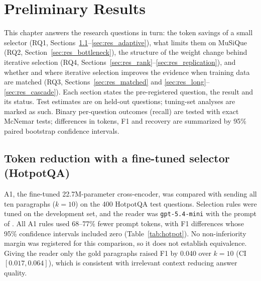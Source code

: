\chapter{Preliminary Results}
\label{chap:results}

This chapter answers the research questions in turn: the token savings of a small selector (RQ1, Sections~\ref{sec:res_selector}--\ref{sec:res_adaptive}), what limits them on MuSiQue (RQ2, Section~\ref{sec:res_bottleneck}), the structure of the weight change behind iterative selection (RQ4, Sections~\ref{sec:res_rank}--\ref{sec:res_replication}), and whether and where iterative selection improves the evidence when training data are matched (RQ3, Sections~\ref{sec:res_matched} and \ref{sec:res_long}--\ref{sec:res_cascade}). Each section states the pre-registered question, the result and its status. Test estimates are on held-out questions; tuning-set analyses are marked as such. Binary per-question outcomes (recall) are tested with exact McNemar tests; differences in tokens, F1 and recovery are summarized by 95\% paired bootstrap confidence intervals.

\section{Token reduction with a fine-tuned selector (HotpotQA)}
\label{sec:res_selector}

A1, the fine-tuned 22.7M-parameter cross-encoder, was compared with sending all ten paragraphs ($k=10$) on the 400 HotpotQA test questions. Selection rules were tuned on the development set, and the reader was \texttt{gpt-5.4-mini} with the prompt of . All A1 rules used 68--77\% fewer prompt tokens, with F1 differences whose 95\% confidence intervals included zero (Table~\ref{tab:hotpot}). No non-inferiority margin was registered for this comparison, so it does not establish equivalence. Giving the reader only the gold paragraphs raised F1 by 0.040 over $k=10$ (CI $[0.017, 0.064]$), which is consistent with irrelevant context reducing answer quality.

